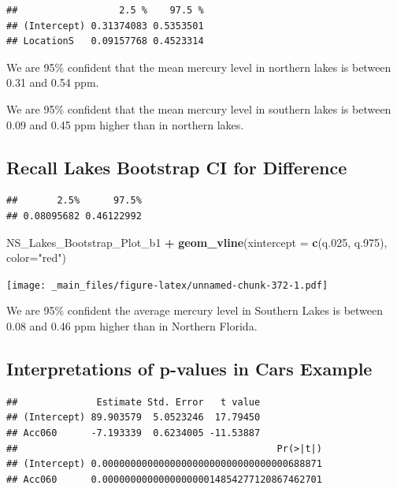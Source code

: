 \documentclass[]{book}
\newenvironment{Shaded}{\begin{snugshade}}{\end{snugshade}}
\newcommand{\KeywordTok}[1]{\textcolor[rgb]{0.13,0.29,0.53}{\textbf{#1}}}
\newcommand{\DataTypeTok}[1]{\textcolor[rgb]{0.13,0.29,0.53}{#1}}
\newcommand{\DecValTok}[1]{\textcolor[rgb]{0.00,0.00,0.81}{#1}}
\newcommand{\StringTok}[1]{\textcolor[rgb]{0.31,0.60,0.02}{#1}}
\newcommand{\OperatorTok}[1]{\textcolor[rgb]{0.81,0.36,0.00}{\textbf{#1}}}
\newcommand{\NormalTok}[1]{#1}
\begin{document}
\begin{verbatim}
##                  2.5 %    97.5 %
## (Intercept) 0.31374083 0.5353501
## LocationS   0.09157768 0.4523314
\end{verbatim}

We are 95\% confident that the mean mercury level in northern lakes is
between 0.31 and 0.54 ppm.

We are 95\% confident that the mean mercury level in southern lakes is
between 0.09 and 0.45 ppm higher than in northern lakes.

\subsection{Recall Lakes Bootstrap CI for
Difference}\label{recall-lakes-bootstrap-ci-for-difference}

\begin{verbatim}
##       2.5%      97.5% 
## 0.08095682 0.46122992
\end{verbatim}

\begin{Shaded}
\begin{Highlighting}[]
\NormalTok{NS_Lakes_Bootstrap_Plot_b1 }\OperatorTok{+}\StringTok{ }\KeywordTok{geom_vline}\NormalTok{(}\DataTypeTok{xintercept =} \KeywordTok{c}\NormalTok{(q.}\DecValTok{025}\NormalTok{, q.}\DecValTok{975}\NormalTok{), }\DataTypeTok{color=}\StringTok{"red"}\NormalTok{)}
\end{Highlighting}
\end{Shaded}

\texttt{[image: \_main\_files/figure-latex/unnamed-chunk-372-1.pdf]}

We are 95\% confident the average mercury level in Southern Lakes is
between 0.08 and 0.46 ppm higher than in Northern Florida.

\subsection{Interpretations of p-values in Cars
Example}\label{interpretations-of-p-values-in-cars-example}

\begin{Shaded}
\end{Shaded}

\begin{verbatim}
##              Estimate Std. Error   t value
## (Intercept) 89.903579  5.0523246  17.79450
## Acc060      -7.193339  0.6234005 -11.53887
##                                              Pr(>|t|)
## (Intercept) 0.000000000000000000000000000000000688871
## Acc060      0.000000000000000000014854277120867462701
\end{verbatim}
\end{document}
